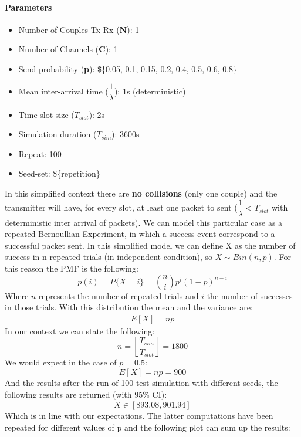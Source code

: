 \paragraph{Parameters}
\begin{itemize}
	\item Number of Couples Tx-Rx (\textbf{N}): 1
	\item Number of Channels (\textbf{C}): 1
	\item Send probability (\textbf{p}): \$\{0.05, 0.1, 0.15, 0.2, 0.4, 0.5, 0.6, 0.8\}
	\item Mean inter-arrival time ($\dfrac{1}{\lambda}$): 1s (deterministic)
	\item Time-slot size ($T_{slot}$): 2s 
	\item Simulation duration ($T_{sim}$): 3600s
	\item Repeat: 100
	\item Seed-set: \$\{repetition\}
\end{itemize}
In this simplified context there are \textbf{no collisions} (only one couple) and the transmitter will have, for every slot, at least one packet to sent ($\dfrac{1}{\lambda} < T_{slot}$ with deterministic inter arrival of packets). We can model this particular case as a repeated Bernoullian Experiment, in which a success event correspond to a successful packet sent. In this simplified model we can define X as the number of success in n repeated trials (in independent condition), so $X \sim Bin(n, p)$. For this reason the PMF is the following:
\begin{equation}
	p(i) = P\{X = i\} = \binom{n}{i} p^{i} (1-p)^{n-i}
\end{equation}
Where $n$ represents the number of repeated trials and $i$ the number of successes in those trials. With this distribution the mean and the variance are:
\begin{align*}
	E[X] = np 
\end{align*}
In our context we can state the following:
\begin{equation}
	n = \left \lfloor{\dfrac{T_{sim}}{T_{slot}}}\right \rfloor = 1800
\end{equation}
We would expect in the case of $p = 0.5$:
\begin{equation}
	E[X] = np = 900
\end{equation}
And the results after the run of 100 test simulation with different seeds, the following results are returned (with 95\% CI):
\begin{equation}
	\overline{X} \in [893.08, 901.94]
\end{equation}
Which is in line with our expectations. The latter computations have been repeated for different values of p and the following plot can sum up the results:

